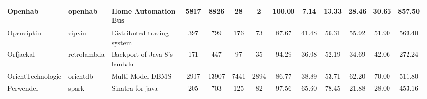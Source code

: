 \begin{table*}[]
{\begin{tabular}{lllcccccccccc}
Openhab                     & openhab                                                       & Home Automation Bus                                                      & 5817           & 8826            & 28                                                               & 2              & 100.00         & 7.14           & 13.33          & 28.46                                                             & 30.66                                                              & 857.50                                               \\ \hline
Openzipkin                  & zipkin                                                        & Distributed tracing system                                               & 397            & 799             & 176                                                              & 73             & 87.67          & 41.48          & 56.31          & 55.92                                                             & 51.90                                                              & 569.40                                               \\ \hline
Orfjackal                   & retrolambda                                                   & Backport of Java 8's lambda                                              & 171            & 447             & 97                                                               & 35             & 94.29          & 36.08          & 52.19          & 34.69                                                             & 42.06                                                              & 272.24                                               \\ \hline
OrientTechnologie           & orientdb                                                      & Multi-Model DBMS                                                         & 2907           & 13907           & 7441                                                             & 2894           & 86.77          & 38.89          & 53.71          & 62.20                                                             & 70.00                                                              & 511.80                                               \\ \hline
Perwendel                   & spark                                                         & Sinatra  for java                                                        & 205            & 703             & 125                                                              & 82             & 97.56          & 65.60          & 78.45          & 21.88                                                             & 28.00                                                              & 453.16                                               \\ \hline

\end{tabular}}
\end{table*}
